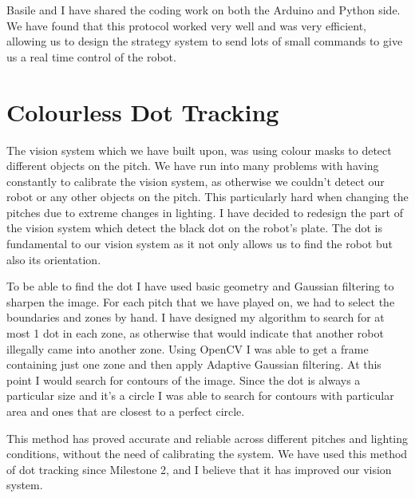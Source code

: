\documentclass[a4paper,12pt]{article}
\begin{document}
Basile and I have shared the coding work on both the Arduino and Python side. We have found that this protocol worked very well and was very efficient, allowing us to design the strategy system to send lots of small commands to give us a real time control of the robot.


\section{Colourless Dot Tracking}

The vision system which we have built upon, was using colour masks to detect different objects on the pitch. We have run into many problems with having constantly to calibrate the vision system, as otherwise we couldn't detect our robot or any other objects on the pitch. This particularly hard when changing the pitches due to extreme changes in lighting. I have decided to redesign the part of the vision system which detect the black dot on the robot's plate. The dot is fundamental to our vision system as it not only allows us to find the robot but also its orientation. 

To be able to find the dot I have used basic geometry and Gaussian filtering to sharpen the image. For each pitch that we have played on, we had to select the boundaries and zones by hand. I have designed my algorithm to search for at most 1 dot in each zone, as otherwise that would indicate that another robot illegally came into another zone. Using OpenCV I was able to get a frame containing just one zone and then apply Adaptive Gaussian filtering. At this point I would search for contours of the image. Since the dot is always a particular size and it's a circle I was able to search for contours with particular area and ones that are closest to a perfect circle. 

This method has proved accurate and reliable across different pitches and lighting conditions, without the need of calibrating the system. We have used this method of dot tracking since Milestone 2, and I believe that it has improved our vision system.

\end{document}
